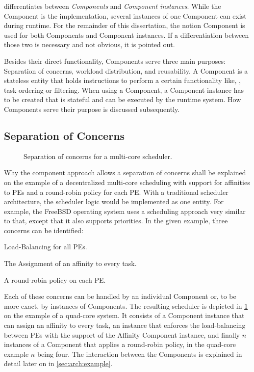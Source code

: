\cobas{} differentiates between \emph{Components} and \emph{Component instances}. While the Component is the implementation, several instances of one Component can exist during runtime. For the remainder of this dissertation, the notion Component is used for both Components and Component instances. If a differentiation between those two is necessary and not obvious, it is pointed out.

Besides their direct functionality, Components serve three main purposes: Separation of concerns, workload distribution, and reusability. A Component is a stateless entity that holds instructions to perform a certain functionality like, \eg{}, task ordering or filtering. When using a Component, a Component instance has to be created that is stateful and can be executed by the runtime system. How Components serve their purpose is discussed subsequently.

\subsection{Separation of Concerns}%
\label{sec:arch:components:concerns}

\begin{figure}[b!] \centering
	\caption{Separation of concerns for a multi-core scheduler.}%
	\label{fig:arch:separation}
\end{figure}

Why the component approach allows a separation of concerns shall be explained on the example of a decentralized multi-core scheduling with support for affinities to \acp{PE} and a round-robin policy for each \ac{PE}. With a traditional scheduler architecture, the scheduler logic would be implemented as one entity. For example, the FreeBSD operating system uses a scheduling approach very similar to that, except that it also supports priorities. In the given example, three concerns can be identified:
\begin{itemize*}
	\item Load-Balancing for all \acp{PE}.
	\item The Assignment of an affinity to every task.
	\item A round-robin policy on each \ac{PE}.
\end{itemize*}

Each of these concerns can be handled by an individual Component or, to be more exact, by instances of Components. The resulting scheduler is depicted in \cref{fig:arch:separation} on the example of a quad-core system. It consists of a Component instance that can assign an affinity to every task, an instance that enforces the load-balancing between \acp{PE} with the support of the Affinity Component instance, and finally \(n\) instances of a Component that applies a round-robin policy, in the quad-core example \(n\) being four. The interaction between the Components is explained in detail later on in \cref{sec:arch:example}.


